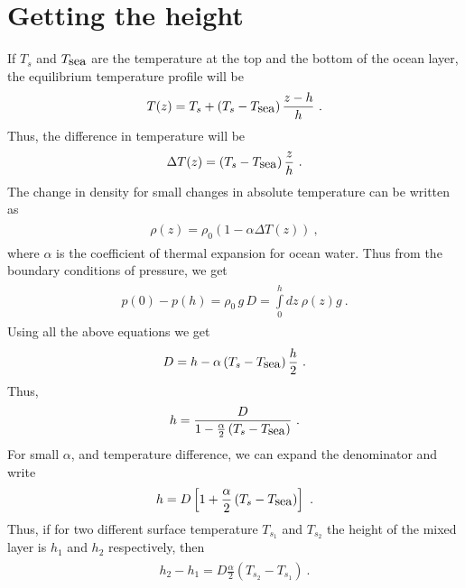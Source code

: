 \documentclass[fontsize = 13pt]{scrartcl}
\begin{document}
\section{Getting the height}
If \(T_s\) and \(T_{\mbox{sea}}\) are the temperature at the top and the bottom of the ocean layer, the equilibrium temperature profile will be
\begin{align}
\begin{split}
    T(z) = T_s + \left( T_s - T_{\mbox{sea}} \right)\frac{z -h}{h} \ .
\end{split}
\end{align}
Thus, the difference in temperature will be 
\begin{align}
\begin{split}
    \Delta T (z) = \left( T_s - T_{\mbox{sea}} \right)\frac{z}{h} \ .
\end{split}
\end{align}
The change in density for small changes in absolute temperature can be written as
\begin{align}
\begin{split}
    \rho(z) = \rho_0 \left( 1 -\alpha \Delta T(z) \right) \ ,
\end{split}
\end{align}
where \(\alpha\) is the coefficient of thermal expansion for ocean water. Thus from the boundary conditions of pressure, we get
\begin{align}
\begin{split}
    p(0) - p(h) =    \rho_0\,g\,D  = \int\limits_{0}^{h} dz\  \rho(z) g  \ . 
\end{split}
\end{align}
Using all the above equations we get
\begin{align}
\begin{split}
    D = h - \alpha \left( T_s - T_{\mbox{sea}} \right)\frac{h}{2} \ .
\end{split}
\end{align}
Thus, 
\begin{align}
\begin{split}
    h = \frac{D}{1 - \frac{\alpha}{2} \left( T_s - T_{\mbox{sea}} \right)} \ .
\end{split}
\end{align}
For small \(\alpha\), and temperature difference, we can expand the denominator and write
\begin{align}
\begin{split}
    h = D\left[ 1 +   \frac{\alpha}{2} \left( T_s - T_{\mbox{sea}} \right)\right] \ .
\end{split}
\end{align}
Thus, if for two different surface temperature $T_{s_1}$ and $T_{s_2}$ the height of the mixed layer is $h_1$ and $h_2$ respectively, then 
\begin{align}
\begin{split}
    h_2 - h_1 =D \frac{\alpha}{2} \left( T_{s_2} -  T_{s_1} \right) \ .
\end{split}
\end{align}
\end{document}
